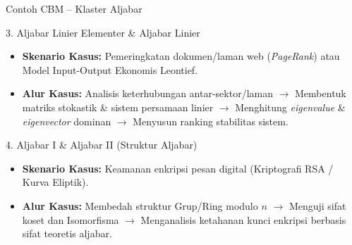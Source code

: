 \documentclass[aspectratio=169]{beamer} %
\begin{document}
\begin{frame}{Contoh CBM – Klaster Aljabar}
    \begin{block}{3. Aljabar Linier Elementer \& Aljabar Linier}
        \begin{itemize}
            \item \textbf{Skenario Kasus:} Pemeringkatan dokumen/laman web (\textit{PageRank}) atau Model Input-Output Ekonomis Leontief.
            \item \textbf{Alur Kasus:} Analisis keterhubungan antar-sektor/laman $\rightarrow$ Membentuk matriks stokastik \& sistem persamaan linier $\rightarrow$ Menghitung \textit{eigenvalue} \& \textit{eigenvector} dominan $\rightarrow$ Menyusun ranking stabilitas sistem.
        \end{itemize}
    \end{block}

    \begin{block}{4. Aljabar I \& Aljabar II (Struktur Aljabar)}
        \begin{itemize}
            \item \textbf{Skenario Kasus:} Keamanan enkripsi pesan digital (Kriptografi RSA / Kurva Eliptik).
            \item \textbf{Alur Kasus:} Membedah struktur Grup/Ring modulo $n$ $\rightarrow$ Menguji sifat koset dan Isomorfisma $\rightarrow$ Menganalisis ketahanan kunci enkripsi berbasis sifat teoretis aljabar.
        \end{itemize}
    \end{block}
\end{frame}
\end{document}
